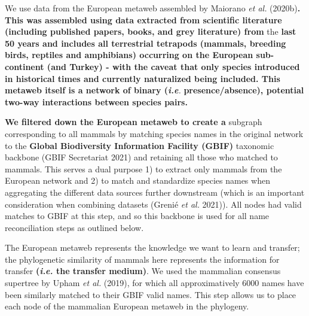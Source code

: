 \documentclass[11pt]{article}
\makeatletter
\def\maxwidth{\ifdim\Gin@nat@width>\linewidth\linewidth
\else\Gin@nat@width\fi}
\let\Oldincludegraphics\includegraphics
\renewcommand{\includegraphics}[1]{\Oldincludegraphics[width=\maxwidth]{#1}}
\providecommand{\DIFaddtex}[1]{{\bf #1}} %
\providecommand{\DIFdeltex}[1]{} %
\providecommand{\DIFaddbegin}{\protect\color{blue}} %
\providecommand{\DIFaddend}{\protect\color{black}} %
\providecommand{\DIFdelbegin}{\protect\color{red}} %
\providecommand{\DIFdelend}{\protect\color{black}} %
\providecommand{\DIFadd}[1]{\texorpdfstring{\DIFaddtex{#1}}{#1}} %
\providecommand{\DIFdel}[1]{\texorpdfstring{\DIFdeltex{#1}}{}} %
\newcommand{\DIFscaledelfig}{0.5}
\newlength{\DIFdelgraphicswidth} %
\newlength{\DIFdelgraphicsheight} %
\newcommand{\DIFaddincludegraphics}[2][]{{\color{blue}\fbox{\DIFOincludegraphics[#1]{#2}}}} %
\newcommand{\DIFdelincludegraphics}[2][]{%
\sbox{\DIFdelgraphicsbox}{\DIFOincludegraphics[#1]{#2}}%
\settoboxwidth{\DIFdelgraphicswidth}{\DIFdelgraphicsbox} %
\settoboxtotalheight{\DIFdelgraphicsheight}{\DIFdelgraphicsbox} %
\scalebox{\DIFscaledelfig}{%
\parbox[b]{\DIFdelgraphicswidth}{\usebox{\DIFdelgraphicsbox}\\[-\baselineskip] \rule{\DIFdelgraphicswidth}{0em}}\llap{\resizebox{\DIFdelgraphicswidth}{\DIFdelgraphicsheight}{%
\setlength{\unitlength}{\DIFdelgraphicswidth}%
\begin{picture}(1,1)%
\thicklines\linethickness{2pt} %
{\color[rgb]{1,0,0}\put(0,0){\framebox(1,1){}}}%
{\color[rgb]{1,0,0}\put(0,0){\line( 1,1){1}}}%
{\color[rgb]{1,0,0}\put(0,1){\line(1,-1){1}}}%
\end{picture}%
}\hspace*{3pt}}} %
} %
\DeclareRobustCommand{\DIFaddbegin}{\DIFOaddbegin \let\includegraphics\DIFaddincludegraphics} %
\DeclareRobustCommand{\DIFaddend}{\DIFOaddend \let\includegraphics\DIFOincludegraphics} %
\DeclareRobustCommand{\DIFdelbegin}{\DIFOdelbegin \let\includegraphics\DIFdelincludegraphics} %
\DeclareRobustCommand{\DIFdelend}{\DIFOaddend \let\includegraphics\DIFOincludegraphics} %
\makeatother
\begin{document}
We use data from the European metaweb assembled by Maiorano \emph{et
al.} (2020b)\DIFdelbegin \DIFdel{, following the definition of the metaweb first introduced
by Dunne (2006), \emph{i.e.} an inventory of all possible interactions
within species from
a spatially delimited pool. Notably the metaweb is
not a prediction of the food web at any specific locale within the
frontiers of the species pool -- in fact,
these local food webs are
expected to have a subset of both the species and }\DIFdelend \DIFaddbegin \DIFadd{. This was assembled using data extracted from scientific
literature (including published papers, books, and grey literature) from
}\DIFaddend the \DIFdelbegin \DIFdel{interactions of
their metaweb (Poisot \emph{et al.} 2012) . This being said, as the
metaweb represents the total of functional, phylogenetic, and
macroecological processes (Morales-Castilla }\DIFdelend \DIFaddbegin \DIFadd{last 50 years and includes all terrestrial tetrapods (mammals,
breeding birds, reptiles and amphibians) occurring on the European
sub-continent (and Turkey) - with the caveat that only species
introduced in historical times and currently naturalized being included.
This metaweb itself is a network of binary (}\DIFaddend \emph{\DIFdelbegin \DIFdel{et al}\DIFdelend \DIFaddbegin \DIFadd{i.e}\DIFaddend .}
\DIFdelbegin \DIFdel{2015), it is
thus still worthy of ecological attention.
We deduced the }\DIFdelend \DIFaddbegin \DIFadd{presence/absence), potential two-way interactions between species pairs.
}

\DIFadd{We filtered down the European metaweb to create a }\DIFaddend subgraph corresponding
to all mammals by matching species names in the original network to the
\DIFdelbegin \DIFdel{GBIF }\DIFdelend \DIFaddbegin \DIFadd{Global Biodiversity Information Facility (GBIF) }\DIFaddend taxonomic backbone (GBIF
Secretariat 2021) and retaining all those who matched to mammals. This
serves a dual purpose 1) to extract only mammals from the European
network and 2) to match and standardize species names when aggregating
the different data sources further downstream (which is an important
consideration when combining datasets (Grenié \emph{et al.} 2021)). All
nodes had valid matches to GBIF at this step, and so this backbone is
used for all name reconciliation steps as outlined below.

The European metaweb represents the knowledge we want to learn and
transfer; the phylogenetic similarity of mammals here represents the
information for transfer \DIFaddbegin \DIFadd{(\emph{i.e.} the transfer medium)}\DIFaddend . We used the
mammalian consensus supertree by Upham \emph{et al.} (2019), for which
all approximatively 6000 names have been similarly matched to their GBIF
valid names. This step allows us to place each node of the mammalian
European metaweb in the phylogeny.
\end{document}
